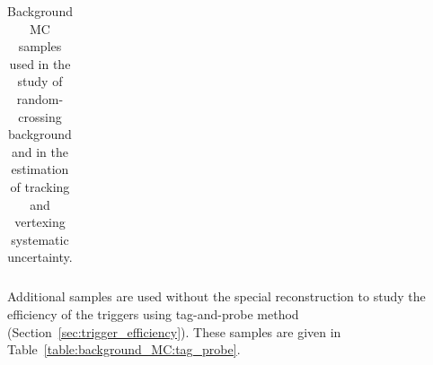 \begin{table}[!htb]
\begin{tabular}{ l l l l l}
    \hline
    \hline
  \end{tabular}
  \caption{Background MC samples used in the study of random-crossing background and in the estimation of tracking and vertexing systematic uncertainty.}
  \label{table:background_MC}
\end{table}


Additional samples are used without the special reconstruction to study the efficiency of the triggers using tag-and-probe method (Section~\ref{sec:trigger_efficiency}). These samples are given in Table~\ref{table:background_MC:tag_probe}.

\begin{table}
  \centering
  \caption{Background MC samples without the LRT used for tag and probe studies.}
  \label{table:background_MC:tag_probe}
\end{table}




